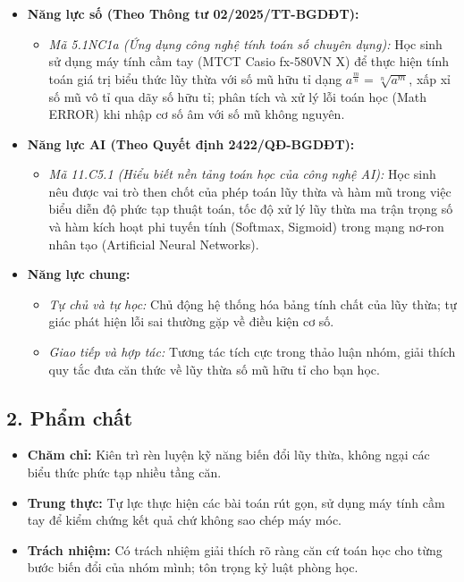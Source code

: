 \documentclass[12pt, a4paper]{article}
\begin{document}
\begin{itemize}[leftmargin=1.2cm]
    \item \textbf{Năng lực số (Theo Thông tư 02/2025/TT-BGDĐT):}
    \begin{itemize}[leftmargin=0.6cm]
        \item \textit{Mã 5.1NC1a (Ứng dụng công nghệ tính toán số chuyên dụng):} Học sinh sử dụng máy tính cầm tay (MTCT Casio fx-580VN X) để thực hiện tính toán giá trị biểu thức lũy thừa với số mũ hữu tỉ dạng $a^{\frac{m}{n}} = \sqrt[n]{a^m}$, xấp xỉ số mũ vô tỉ qua dãy số hữu tỉ; phân tích và xử lý lỗi toán học (Math ERROR) khi nhập cơ số âm với số mũ không nguyên.
    \end{itemize}

    \item \textbf{Năng lực AI (Theo Quyết định 2422/QĐ-BGDĐT):}
    \begin{itemize}[leftmargin=0.6cm]
        \item \textit{Mã 11.C5.1 (Hiểu biết nền tảng toán học của công nghệ AI):} Học sinh nêu được vai trò then chốt của phép toán lũy thừa và hàm mũ trong việc biểu diễn độ phức tạp thuật toán, tốc độ xử lý lũy thừa ma trận trọng số và hàm kích hoạt phi tuyến tính (Softmax, Sigmoid) trong mạng nơ-ron nhân tạo (Artificial Neural Networks).
    \end{itemize}

    \item \textbf{Năng lực chung:}
    \begin{itemize}[leftmargin=0.6cm]
        \item \textit{Tự chủ và tự học:} Chủ động hệ thống hóa bảng tính chất của lũy thừa; tự giác phát hiện lỗi sai thường gặp về điều kiện cơ số.
        \item \textit{Giao tiếp và hợp tác:} Tương tác tích cực trong thảo luận nhóm, giải thích quy tắc đưa căn thức về lũy thừa số mũ hữu tỉ cho bạn học.
    \end{itemize}
\end{itemize}

\subsection*{2. Phẩm chất}

\begin{itemize}[leftmargin=1.2cm]
    \item \textbf{Chăm chỉ:} Kiên trì rèn luyện kỹ năng biến đổi lũy thừa, không ngại các biểu thức phức tạp nhiều tầng căn.
    \item \textbf{Trung thực:} Tự lực thực hiện các bài toán rút gọn, sử dụng máy tính cầm tay để kiểm chứng kết quả chứ không sao chép máy móc.
    \item \textbf{Trách nhiệm:} Có trách nhiệm giải thích rõ ràng căn cứ toán học cho từng bước biến đổi của nhóm mình; tôn trọng kỷ luật phòng học.
\end{itemize}
\end{document}
